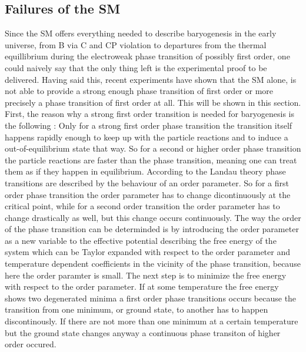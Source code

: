 \subsection{Failures of the SM}
Since the SM offers everything needed to describe baryogenesis in the early universe, from B via C and CP violation to departures from the thermal equillibrium during the electroweak phase transition of possibly first order, one could naively say that the only thing left is the experimental proof to be delivered. \newline\indent
Having said this, recent experiments have shown that the SM alone, is not able to provide a strong enough phase transition of first order or more precisely a phase transition of first order at all. This will be shown in this section. \newline\indent
First, the reason why a strong first order transition is needed for baryogenesis is the following \cite[p. 25]{Bernreuther:2002uj}: Only for a strong first order phase transition the transition itself happens rapidly enough to keep up with the particle reactions and to induce a out-of-equilibrium state that way. So for a second or higher order phase transition the particle reactions are faster than the phase transition, meaning one can treat them as if they happen in equilibrium.\newline\indent
According to the Landau theory phase transitions are described by the behaviour of an order parameter. So for a first order phase transition the order parameter has to change dicontinuously at the critical point, while for a second order transition the order parameter has to change drastically as well, but this change occurs continuously. The way the order of the phase transition can be determinded is by introducing the order parameter as a new variable to the effective potential describing the free energy of the system which can be Taylor expanded with respect to the order parameter and temperature dependent coefficients in the vicinity of the phase transition, because here the order paramter is small. The next step is to minimize the free energy with respect to the order parameter. If at some temperature the free energy shows two degenerated minima a first order phase transitions occurs because the transition from one minimum, or ground state, to another has to happen discontinously. If there are not more than one minimum at a certain temperature but the ground state changes anyway a continuous phase transiton of higher order occured. 
\newline \indent
